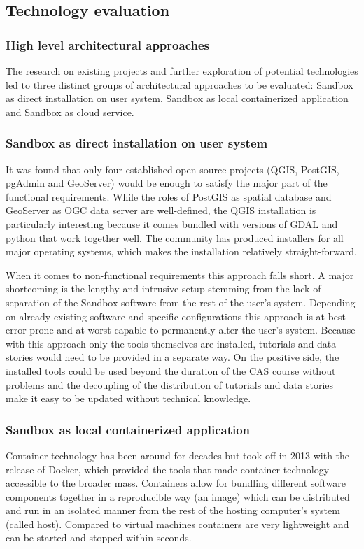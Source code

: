 \documentclass[11pt, a4paper, oneside, parskip=full-]{scrartcl}
\begin{document}
\subsection{Technology evaluation}

\subsubsection{High level architectural approaches}
The research on existing projects and further exploration of potential
technologies led to three distinct groups of architectural approaches to be
evaluated: Sandbox as direct installation on user system, Sandbox as local
containerized application and Sandbox as cloud service.

\subsubsection*{Sandbox as direct installation on user system}
It was found that only four established open-source projects (QGIS\cite{qgis},
PostGIS\cite{postgis}, pgAdmin\cite{pgadmin} and GeoServer\cite{geoserver})
would be enough to satisfy the major part of the functional requirements. While
the roles of PostGIS as spatial database and GeoServer as OGC data server are
well-defined, the QGIS installation is particularly interesting because it comes
bundled with versions of GDAL and python that work together well. The community
has produced installers for all major operating systems, which makes the
installation relatively straight-forward.

When it comes to non-functional requirements this approach falls short. A major
shortcoming is the lengthy and intrusive setup stemming from the lack of
separation of the Sandbox software from the rest of the user's system. Depending
on already existing software and specific configurations this approach is at
best error-prone and at worst capable to permanently alter the user's system.
Because with this approach only the tools themselves are installed, tutorials
and data stories would need to be provided in a separate way. On the positive
side, the installed tools could be used beyond the duration of the CAS course
without problems and the decoupling of the distribution of tutorials and data
stories make it easy to be updated without technical knowledge.

\subsubsection*{Sandbox as local containerized application}
Container technology has been around for decades but took off in 2013 with the
release of Docker, which provided the tools that made container technology
accessible to the broader mass. Containers allow for bundling different software
components together in a reproducible way (an image) which can be distributed
and run in an isolated manner from the rest of the hosting computer's system
(called host). Compared to virtual machines containers are very lightweight and
can be started and stopped within seconds.
\end{document}
